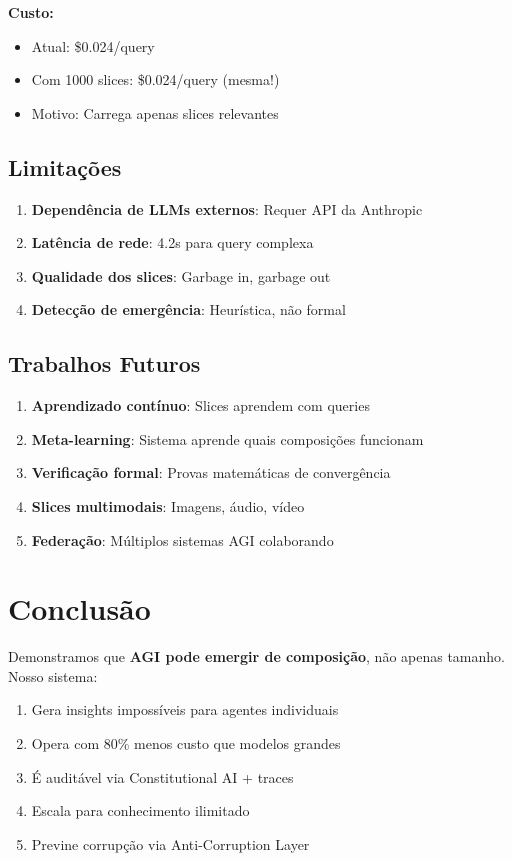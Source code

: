 \documentclass[11pt]{article}
\begin{document}
\textbf{Custo:}
\begin{itemize}
    \item Atual: \$0.024/query
    \item Com 1000 slices: \$0.024/query (mesma!)
    \item Motivo: Carrega apenas slices relevantes
\end{itemize}

\subsection{Limitações}

\begin{enumerate}
    \item \textbf{Dependência de LLMs externos}: Requer API da Anthropic
    \item \textbf{Latência de rede}: 4.2s para query complexa
    \item \textbf{Qualidade dos slices}: Garbage in, garbage out
    \item \textbf{Detecção de emergência}: Heurística, não formal
\end{enumerate}

\subsection{Trabalhos Futuros}

\begin{enumerate}
    \item \textbf{Aprendizado contínuo}: Slices aprendem com queries
    \item \textbf{Meta-learning}: Sistema aprende quais composições funcionam
    \item \textbf{Verificação formal}: Provas matemáticas de convergência
    \item \textbf{Slices multimodais}: Imagens, áudio, vídeo
    \item \textbf{Federação}: Múltiplos sistemas AGI colaborando
\end{enumerate}

\section{Conclusão}

Demonstramos que \textbf{AGI pode emergir de composição}, não apenas tamanho. Nosso sistema:

\begin{enumerate}
    \item Gera insights impossíveis para agentes individuais
    \item Opera com 80\% menos custo que modelos grandes
    \item É auditável via Constitutional AI + traces
    \item Escala para conhecimento ilimitado
    \item Previne corrupção via Anti-Corruption Layer
\end{enumerate}
\end{document}
